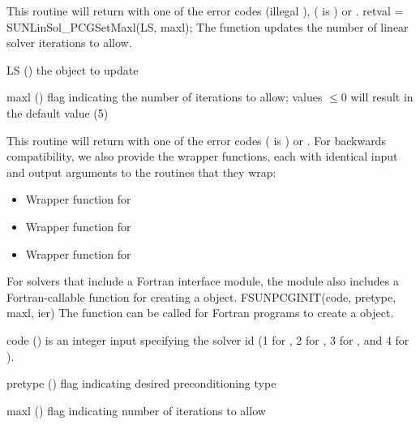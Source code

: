 {
  This routine will return with one of the error codes
   (illegal ), 
  ( is ) or .
}
{
}
{
  retval = SUNLinSol\_PCGSetMaxl(LS, maxl);
}
{
  The function  updates the number of
  linear solver iterations to allow.
}
{
  \begin{args}[maxl]
  \item[LS] ()
    the {\sunlinsolpcg} object to update
  \item[maxl] ()
    flag indicating the number of iterations to allow; values $\le0$
    will result in the default value (5)
  \end{args}
}
{
  This routine will return with one of the error codes
   ( is ) or .
}
{
}
For backwards compatibility, we also provide the wrapper functions,
each with identical input and output arguments to the routines that
they wrap:
\begin{itemize}

\item {}

  Wrapper function for 

\item {}

  Wrapper function for 

\item {}

  Wrapper function for 

\end{itemize}
For solvers that include a Fortran interface module, the
{\sunlinsolpcg} module also includes a Fortran-callable function
for creating a  object.
{
  FSUNPCGINIT(code, pretype, maxl, ier)
}
{
  The function  can be called for Fortran programs
  to create a {\sunlinsolpcg} object.
}
{
  \begin{args}[pretype]
  \item[code] ()
    is an integer input specifying the solver id (1 for {\cvode}, 2
    for {\ida}, 3 for {\kinsol}, and 4 for {\arkode}).
  \item[pretype] ()
    flag indicating desired preconditioning type
  \item[maxl] ()
    flag indicating number of iterations to allow
  \end{args}
}
